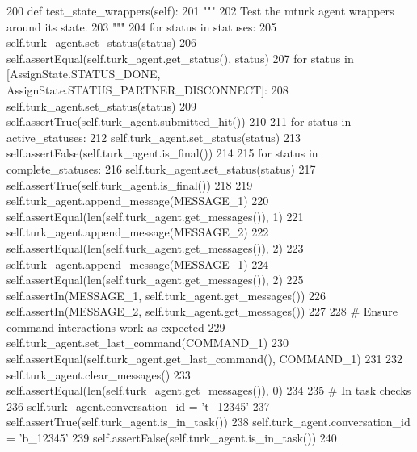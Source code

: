 \begin{DoxyCode}
200     \textcolor{keyword}{def }test\_state\_wrappers(self):
201         \textcolor{stringliteral}{"""}
202 \textcolor{stringliteral}{        Test the mturk agent wrappers around its state.}
203 \textcolor{stringliteral}{        """}
204         \textcolor{keywordflow}{for} status \textcolor{keywordflow}{in} statuses:
205             self.turk\_agent.set\_status(status)
206             self.assertEqual(self.turk\_agent.get\_status(), status)
207         \textcolor{keywordflow}{for} status \textcolor{keywordflow}{in} [AssignState.STATUS\_DONE, AssignState.STATUS\_PARTNER\_DISCONNECT]:
208             self.turk\_agent.set\_status(status)
209             self.assertTrue(self.turk\_agent.submitted\_hit())
210 
211         \textcolor{keywordflow}{for} status \textcolor{keywordflow}{in} active\_statuses:
212             self.turk\_agent.set\_status(status)
213             self.assertFalse(self.turk\_agent.is\_final())
214 
215         \textcolor{keywordflow}{for} status \textcolor{keywordflow}{in} complete\_statuses:
216             self.turk\_agent.set\_status(status)
217             self.assertTrue(self.turk\_agent.is\_final())
218 
219         self.turk\_agent.append\_message(MESSAGE\_1)
220         self.assertEqual(len(self.turk\_agent.get\_messages()), 1)
221         self.turk\_agent.append\_message(MESSAGE\_2)
222         self.assertEqual(len(self.turk\_agent.get\_messages()), 2)
223         self.turk\_agent.append\_message(MESSAGE\_1)
224         self.assertEqual(len(self.turk\_agent.get\_messages()), 2)
225         self.assertIn(MESSAGE\_1, self.turk\_agent.get\_messages())
226         self.assertIn(MESSAGE\_2, self.turk\_agent.get\_messages())
227 
228         \textcolor{comment}{# Ensure command interactions work as expected}
229         self.turk\_agent.set\_last\_command(COMMAND\_1)
230         self.assertEqual(self.turk\_agent.get\_last\_command(), COMMAND\_1)
231 
232         self.turk\_agent.clear\_messages()
233         self.assertEqual(len(self.turk\_agent.get\_messages()), 0)
234 
235         \textcolor{comment}{# In task checks}
236         self.turk\_agent.conversation\_id = \textcolor{stringliteral}{'t\_12345'}
237         self.assertTrue(self.turk\_agent.is\_in\_task())
238         self.turk\_agent.conversation\_id = \textcolor{stringliteral}{'b\_12345'}
239         self.assertFalse(self.turk\_agent.is\_in\_task())
240 
\end{DoxyCode}
\mbox{\label{classparlai_1_1mturk_1_1core_1_1test_1_1test__mturk__agent_1_1TestMTurkAgent_a0e2c4db2bcdb4f21f70860cf86aa2c32}} 
